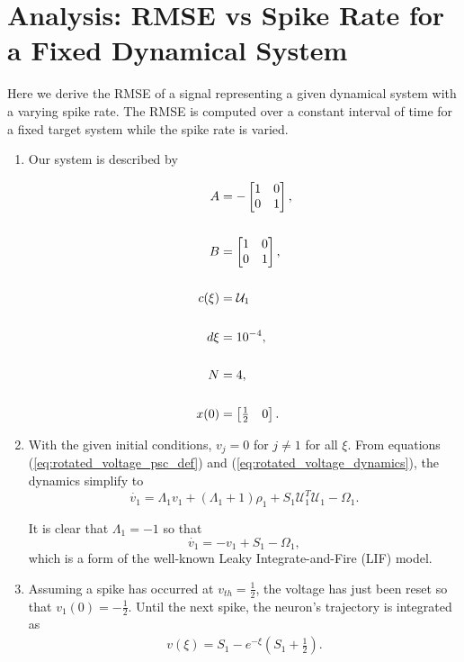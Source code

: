
\section{Analysis: RMSE vs Spike Rate for a Fixed Dynamical System}
\label{section:analysis:rmse_vs_spike_rate_constant_dynamics}

 Here we derive the RMSE of a signal representing a given dynamical system with a varying spike rate. The RMSE is computed over a constant interval of time for a fixed target system while the spike rate is varied.  
\begin{enumerate}
\item Our system is described by 

\begin{align*}
A &= -\begin{bmatrix}  
1 & 0 \\
0 & 1
\end{bmatrix},\notag \\
\notag \\
B &= \begin{bmatrix}  
1 & 0 \\
0 & 1
\end{bmatrix}, \notag \\
\notag \\
c(\xi) &= \mathcal{U}_1 \\
\notag \\
d\xi &= 10^{-4},\notag \\
\notag \\
N &= 4,\notag \\
\notag \\
x(0) &= \begin{bmatrix} \frac{1}{2} & 0 \end{bmatrix}.\notag 
\end{align*}

\item With the given initial conditions, $v_j = 0$ for $j \neq 1$ for all $\xi$. From equations (\ref{eq:rotated_voltage_psc_def}) and (\ref{eq:rotated_voltage_dynamics}), the dynamics simplify to 
\begin{equation*}
\dot{v_1} = \Lambda_1 v_1 + (\Lambda_1 + 1)\rho_1 + S_1 \mathcal{U}_1^T \mathcal{U}_1 - \Omega_1.
\end{equation*}

It is clear that $\Lambda_1 = -1$ so that 
\begin{equation}
\label{eq:analysis_voltage_dynamics_constant_driving_const_dynamics}
\dot{v_1} = -v_1 + S_1 - \Omega_1,
\end{equation}
which is a form of the well-known Leaky Integrate-and-Fire (LIF) model.
\item  Assuming a spike has occurred at $v_{th} = \frac{1}{2}$, the voltage has just been reset so that $v_1(0) = -\frac{1}{2}$. Until the next spike, the neuron's trajectory is integrated as 
\begin{align*}
v(\xi) =  S_1 - e^{-\xi} (S_1 + \frac{1}{2}).
\end{align*}


\end{enumerate}
